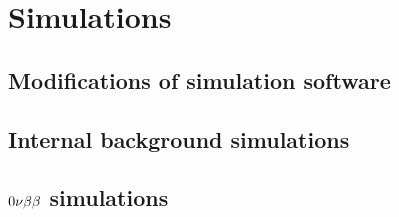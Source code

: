 


\section{Simulations}
\subsection{Modifications of simulation software}
\subsection{Internal background simulations}
\subsection{$0\nu\beta\beta$ simulations}
